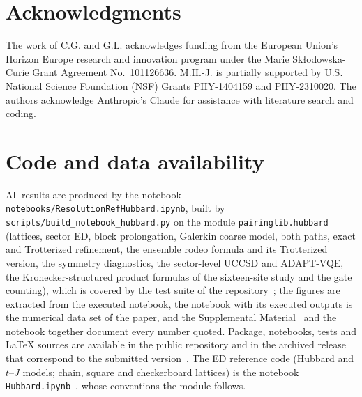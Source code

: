 \documentclass[a4paper,11pt,noarxiv]{quantumarticle}
\newcommand{\SM}{Supplemental Material~\cite{SM}}
\begin{document}
\section*{Acknowledgments}
The work of C.G. and G.L. acknowledges funding from the European Union's
Horizon Europe research and innovation program under the Marie
Sk\l{}odowska-Curie Grant Agreement No.\ 101126636.  M.H.-J. is partially
supported by U.S. National Science Foundation (NSF) Grants PHY-1404159 and
PHY-2310020.  The authors acknowledge Anthropic's Claude for assistance with
literature search and coding.

\section*{Code and data availability}
\label{sec:code}
All results are produced by the notebook
\texttt{notebooks/ResolutionRefHubbard.ipynb}, built by
\texttt{scripts/build\_notebook\_hubbard.py} on the module
\texttt{pairinglib.hubbard} (lattices, sector ED, block prolongation,
Galerkin coarse model, both paths, exact and Trotterized refinement, the
ensemble rodeo formula and its Trotterized version, the symmetry
diagnostics, the sector-level UCCSD and ADAPT-VQE, the Kronecker-structured
product formulas of the sixteen-site study and the gate counting), which is
covered by the test suite of the repository~\cite{Code}; the figures are
extracted from the executed notebook, the notebook with its executed
outputs is the numerical data set of the paper, and the \SM{} and the
notebook together document every number quoted.  Package, notebooks,
tests and \LaTeX{} sources are available in the public repository and in
the archived release that correspond to the submitted version~\cite{Code}.  The ED reference code (Hubbard and
$t$--$J$ models; chain, square and checkerboard lattices) is the notebook
\texttt{Hubbard.ipynb}~\cite{HubbardNotebook}, whose conventions the module
follows.
\end{document}
